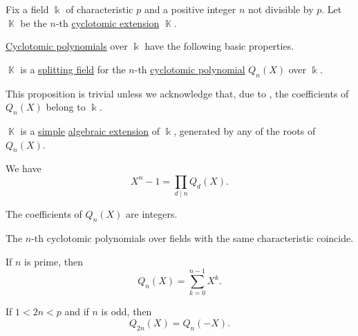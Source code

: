 \begin{proposition}\label{thm:def:cyclotomic_polynomial}
  Fix a field \( \Bbbk \) of characteristic \( p \) and a positive integer \( n \) not divisible by \( p \). Let \( \BbbK \) be the \( n \)-th \hyperref[def:cyclotomic_extension]{cyclotomic extension} \( \BbbK \).

  \hyperref[def:cyclotomic_polynomial]{Cyclotomic polynomials} over \( \Bbbk \) have the following basic properties.
  \begin{thmenum}
     \( \BbbK \) is a \hyperref[def:splitting_field]{splitting field} for the \( n \)-th \hyperref[def:cyclotomic_polynomial]{cyclotomic polynomial} \( Q_n(X) \) over \( \Bbbk \).

    \item This proposition is trivial unless we acknowledge that, due to , the coefficients of \( Q_n(X) \) belong to \( \Bbbk \).

     \( \BbbK \) is a \hyperref[def:simple_field_extension]{simple} \hyperref[def:algebraic_extension]{algebraic extension} of \( \Bbbk \), generated by any of the roots of \( Q_n(X) \).

     We have
    \begin{equation}\label{eq:thm:def:cyclotomic_polynomial/product}
      X^n - 1 = \prod_{d \mid n} Q_d(X).
    \end{equation}

    \cite[thm. 2.45(ii)]{LidlNiederreiter1997FiniteFields} The coefficients of \( Q_n(X) \) are integers.

     The \( n \)-th cyclotomic polynomials over fields with the same characteristic coincide.

     If \( n \) is prime, then
    \begin{equation}\label{eq:thm:def:cyclotomic_polynomial/prime}
      Q_n(X) = \sum_{k=0}^{n-1} X^k.
    \end{equation}

     If \( 1 < 2n < p \) and if \( n \) is odd, then
    \begin{equation}\label{eq:thm:def:cyclotomic_polynomial/odd}
      Q_{2n}(X) = Q_n(-X).
    \end{equation}
  \end{thmenum}
\end{proposition}
